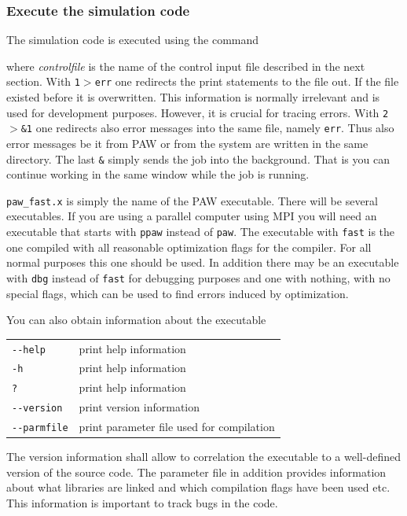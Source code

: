 \documentclass[final,12pt]{article}
\begin{document}
\subsubsection{Execute the simulation code}

The simulation code is executed using the command

\bigskip{}\bigskip

\noindent where {\it controlfile} is the name of the control input
file described in the next section.  With {\tt 1$>$err} one redirects
the print statements to the file out. If the file existed before it is
overwritten. This information is normally irrelevant and is used for
development purposes. However, it is crucial for tracing errors.  With
{\tt 2$>$\&1} one redirects also error messages into the same file,
namely {\tt err}. Thus also error messages be it from PAW or from the
system are written in the same directory. The last {\tt \&} simply
sends the job into the background. That is you can continue working in
the same window while the job is running.

{\tt paw\_fast.x} is simply the name of the PAW executable. There will
be several executables. If you are using a parallel computer using MPI
you will need an executable that starts with {\tt ppaw} instead of
{\tt paw}. The executable with {\tt fast} is the one compiled with all
reasonable optimization flags for the compiler. For all normal
purposes this one should be used. In addition there may be an
executable with {\tt dbg} instead of {\tt fast} for debugging purposes
and one with nothing, with no special flags, which can be used to find
errors induced by optimization.

You can also obtain information about the executable
\begin{center}
\begin{tabular}{ll}
\verb+--help+ & print help information \\
\verb+-h+ & print help information \\
\verb+?+ & print help information \\
\verb+--version+ & print version information\\
\verb+--parmfile+ & print parameter file used for compilation\\
\end{tabular}
\end{center}
The version information shall allow to correlation the executable to a
well-defined version of the source code. The parameter file in
addition provides information about what libraries are linked and
which compilation flags have been used etc. This information is
important to track bugs in the code.
\end{document}
